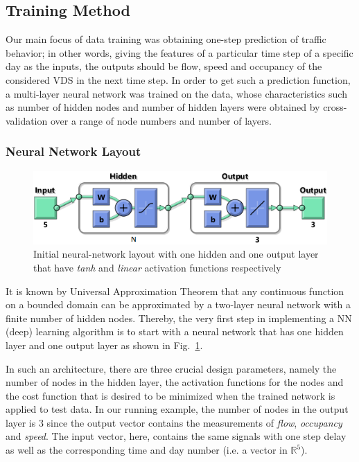 \documentclass[twocolumn,10pt]{asme2e}
\begin{document}
\subsection{Training Method}
Our main focus of data training was obtaining one-step prediction of traffic behavior; in other words, giving the features of a particular time step of a specific day as the inputs, the outputs should be flow, speed and occupancy of the considered VDS in the next time step. In order to get such a prediction function, a multi-layer neural network was trained on the data, whose characteristics such as number of hidden nodes and number of hidden layers were obtained by cross-validation over a range of node numbers and number of layers.

\subsubsection{Neural Network Layout}

\begin{figure}[t]
	\centering
	\includegraphics[width=1\linewidth]{./Figures/NN_1}
	\caption{Initial neural-network layout with one hidden and one output layer that have \emph{tanh} and \emph{linear} activation functions respectively }
	\label{fig:nn1}
\end{figure} 

It is known by Universal Approximation Theorem  \cite{universality} that any continuous function on a bounded domain can be approximated by a two-layer neural network with a finite number of hidden nodes. Thereby, the very first step in implementing a NN (deep) learning algorithm is to start with a neural network that has one hidden layer and one output layer as shown in Fig.~\ref{fig:nn1}. 

In such an architecture, there are three crucial design parameters, namely the number of nodes in the hidden layer, the activation functions for the nodes and the cost function that is desired to be minimized when the trained network is applied to test data. In our running example, the number of nodes in the output layer is 3 since the output vector contains the measurements of \emph{flow}, \emph{occupancy} and \emph{speed}. The input vector, here, contains the same signals with one step delay as well as the corresponding time and day number (i.e. a vector in $\mathbb{R}^5$). 
\end{document}
